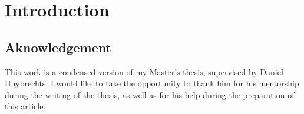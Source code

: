\section{Introduction}





\subsection{Aknowledgement}
This work is a condensed version of my Master's thesis, supervised by Daniel Huybrechts. I would like to take the opportunity to thank him for his mentorship during the writing of the thesis, as well as for his help during the preparation of this article.